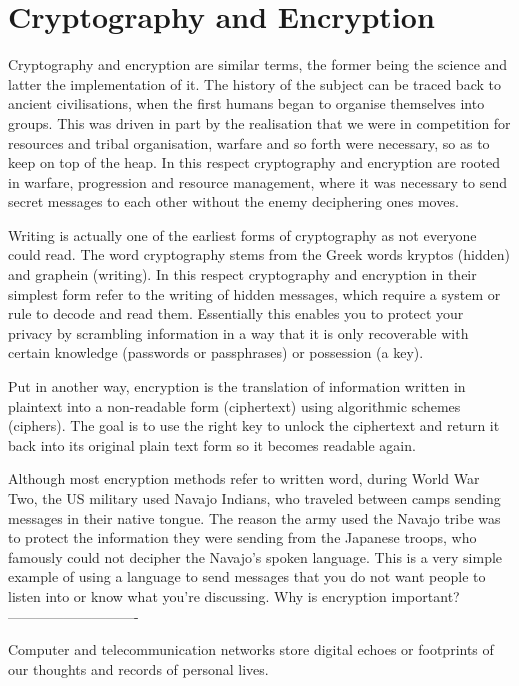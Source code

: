 \section{Cryptography and Encryption}

Cryptography and encryption are similar terms, the former being the
science and latter the implementation of it. The history of the subject
can be traced back to ancient civilisations, when the first humans began
to organise themselves into groups. This was driven in part by the
realisation that we were in competition for resources and tribal
organisation, warfare and so forth were necessary, so as to keep on top
of the heap. In this respect cryptography and encryption are rooted in
warfare, progression and resource management, where it was necessary to
send secret messages to each other without the enemy deciphering ones
moves.

Writing is actually one of the earliest forms of cryptography as not
everyone could read. The word cryptography stems from the Greek words
kryptos (hidden) and graphein (writing). In this respect cryptography
and encryption in their simplest form refer to the writing of hidden
messages, which require a system or rule to decode and read them.
Essentially this enables you to protect your privacy by scrambling
information in a way that it is only recoverable with certain knowledge
(passwords or passphrases) or possession (a key).

Put in another way, encryption is the translation of information written
in plaintext into a non-readable form (ciphertext) using algorithmic
schemes (ciphers). The goal is to use the right key to unlock the
ciphertext and return it back into its original plain text form so it
becomes readable again.

Although most encryption methods refer to written word, during World War
Two, the US military used Navajo Indians, who traveled between camps
sending messages in their native tongue. The reason the army used the
Navajo tribe was to protect the information they were sending from the
Japanese troops, who famously could not decipher the Navajo's spoken
language. This is a very simple example of using a language to send
messages that you do not want people to listen into or know what you're
discussing. Why is encryption important? ----------------------------

Computer and telecommunication networks store digital echoes or
footprints of our thoughts and records of personal lives.

